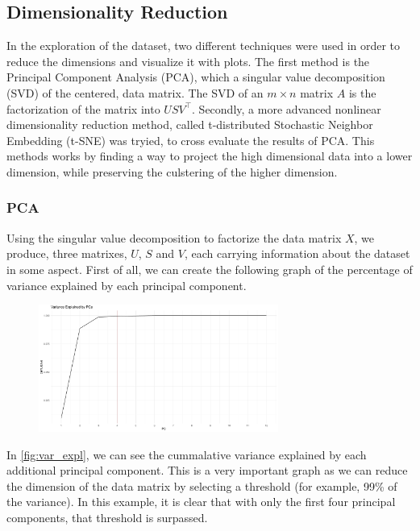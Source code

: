 \documentclass[11pt,twoside]{article}
\numberwithin{Theorem}{section}
\numberwithin{Definition}{section}
\numberwithin{Lemma}{section}
\numberwithin{Algorithm}{section}
\numberwithin{equation}{section}
\begin{document}
\subsection{Dimensionality Reduction}
\label{sec:reduction}
In the exploration of the dataset, two different techniques were used in order to reduce the dimensions and visualize it with plots. The first method is the Principal Component Analysis (PCA), which a singular value decomposition (SVD) of the centered, data matrix. The SVD of an $ m \times n $ matrix $A$ is the factorization of the matrix into $USV^\top$. Secondly, a more advanced nonlinear dimensionality reduction method, called t-distributed Stochastic Neighbor Embedding (t-SNE) was tryied, to cross evaluate the results of PCA. This methods works by finding a way to project the high dimensional data into a lower dimension, while preserving the culstering of the higher dimension.

\subsubsection{PCA}
\label{sec:pca}

Using the singular value decomposition to factorize the data matrix $X$, we produce, three matrixes, $U$, $S$ and $V$, each carrying information about the dataset in some aspect. First of all, we can create the following graph of the percentage of variance explained by each principal component. 
\vspace*{1em}
\begin{figure}[!h]
\centering
\includegraphics[width=0.7\textwidth]{./output/1.a.pca-var-expl.pdf}
\caption{}
\label{fig:var_expl}
\end{figure}
\vspace{2em}

In \autoref{fig:var_expl}, we can see the cummalative variance explained by each additional principal component. This is a very important graph as we can reduce the dimension of the data matrix by selecting a threshold (for example, 99\% of the variance). In this example, it is clear that with only the first four principal components, that threshold is surpassed.
\end{document}
